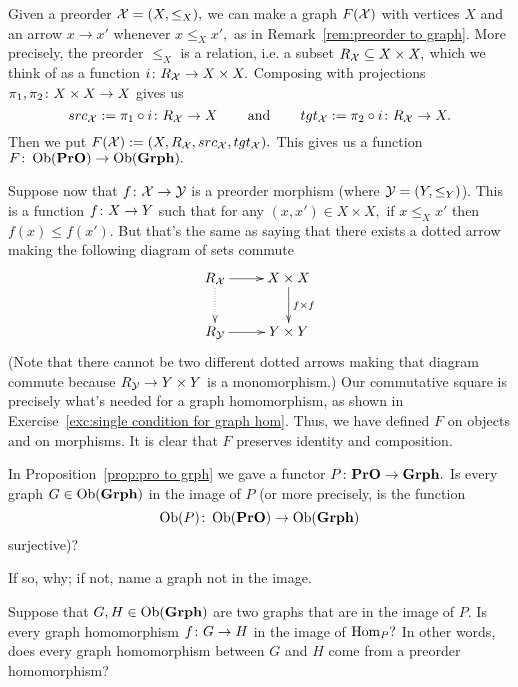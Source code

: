 \documentclass[../main/CT4S-EN-RU]{subfiles}
\begin{document}
\begin{propositionRUS}\label{prop:pro to grph}
\end{propositionRUS}

\begin{proofENG}
Given a preorder $\mathcal{X}=(X,\leq_X),$ we can make a graph $F(\mathcal{X})$ with vertices $X$ and an arrow $x\to x'$ whenever $x\leq_X x',$ as in Remark~\ref{rem:preorder to graph}. More precisely, the preorder $\leq_X$ is a relation, i.e. a subset $R_\mathcal{X}\subseteq X\times X,$ which we think of as a function $i\colon R_\mathcal{X}\rightarrow X\times X.$ Composing with projections $\pi_1,\pi_2\colon X\times X\rightarrow X$ gives us $$src_\mathcal{X}:=\pi_1\circ i\colon R_\mathcal{X}\rightarrow X\hspace{.3in}\textnormal{and}\hspace{.3in} tgt_\mathcal{X}:=\pi_2\circ i\colon R_\mathcal{X}\rightarrow X.$$ Then we put $F(\mathcal{X}):=(X,R_\mathcal{X},src_\mathcal{X},tgt_\mathcal{X}).$ This gives us a function $F\colon\operatorname{Ob}({\mathbf{PrO}})\rightarrow\operatorname{Ob}({\mathbf{Grph}}).$

Suppose now that $f\colon\mathcal{X}\rightarrow\mathcal{Y}$ is a preorder morphism (where $\mathcal{Y}=(Y,\leq_Y)$). This is a function $f\colon X\rightarrow Y$ such that for any $(x,x')\in X\times X,$ if $x\leq_X x'$ then $f(x)\leq f(x').$ But that's the same as saying that there exists a dotted arrow making the following diagram of sets commute
$$
\xymatrix{R_\mcX\ar[r]\ar@{..>}[d]&X\times X\ar[d]^{f\times f}\\R_\mcY\ar[r]&Y\times Y
}
$$
(Note that there cannot be two different dotted arrows making that diagram commute because $R_\mathcal{Y}\rightarrow Y\times Y$ is a monomorphism.) 
Our commutative square is precisely what's needed for a graph homomorphism, as shown in Exercise~\ref{exc:single condition for graph hom}. Thus, we have defined $F$ on objects and on morphisms. It is clear that $F$ preserves identity and composition.
\end{proofENG}

\begin{proofRUS}
\end{proofRUS}

\begin{exerciseENG}
In Proposition~\ref{prop:pro to grph} we gave a functor $P\colon{\mathbf{PrO}}\rightarrow{\mathbf{Grph}}.$
\sexc  Is every graph $G\in\operatorname{Ob}({\mathbf{Grph}})$ in the image of $P$ (or more precisely, is the function $$\operatorname{Ob}(P)\colon\operatorname{Ob}({\mathbf{PrO}})\rightarrow\operatorname{Ob}({\mathbf{Grph}})$$ surjective)?
\item If so, why; if not, name a graph not in the image.
\item Suppose that $G, H\in\operatorname{Ob}({\mathbf{Grph}})$ are two graphs that are in the image of $P.$ Is every graph homomorphism $f\colon G\rightarrow H$ in the image of $\operatorname{Hom}_P?$ In other words, does every graph homomorphism between $G$ and $H$ come from a preorder homomorphism?
\endsexc
\end{exerciseENG}
\end{document}
